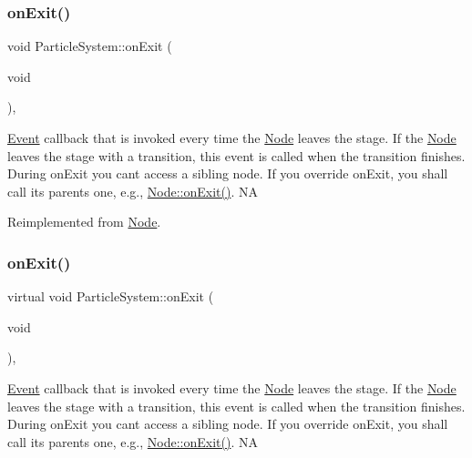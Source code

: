 \subsubsection{\texorpdfstring{on\+Exit()}{onExit()}\hspace{0.1cm}{\footnotesize\ttfamily [1/2]}}
{\footnotesize\ttfamily void Particle\+System\+::on\+Exit (\begin{DoxyParamCaption}\item[{void}]{ }\end{DoxyParamCaption})\hspace{0.3cm}{\ttfamily [override]}, {\ttfamily [virtual]}}

\hyperlink{classEvent}{Event} callback that is invoked every time the \hyperlink{classNode}{Node} leaves the \textquotesingle{}stage\textquotesingle{}. If the \hyperlink{classNode}{Node} leaves the \textquotesingle{}stage\textquotesingle{} with a transition, this event is called when the transition finishes. During on\+Exit you can\textquotesingle{}t access a sibling node. If you override on\+Exit, you shall call its parent\textquotesingle{}s one, e.\+g., \hyperlink{classNode_ac83de835ea315e3179d4293acd8903ac}{Node\+::on\+Exit()}.  NA 

Reimplemented from \hyperlink{classNode_ac83de835ea315e3179d4293acd8903ac}{Node}.

\mbox{\label{classParticleSystem_a98582a329312cfc77d39cc872d5c344c}} 
\subsubsection{\texorpdfstring{on\+Exit()}{onExit()}\hspace{0.1cm}{\footnotesize\ttfamily [2/2]}}
{\footnotesize\ttfamily virtual void Particle\+System\+::on\+Exit (\begin{DoxyParamCaption}\item[{void}]{ }\end{DoxyParamCaption})\hspace{0.3cm}{\ttfamily [override]}, {\ttfamily [virtual]}}

\hyperlink{classEvent}{Event} callback that is invoked every time the \hyperlink{classNode}{Node} leaves the \textquotesingle{}stage\textquotesingle{}. If the \hyperlink{classNode}{Node} leaves the \textquotesingle{}stage\textquotesingle{} with a transition, this event is called when the transition finishes. During on\+Exit you can\textquotesingle{}t access a sibling node. If you override on\+Exit, you shall call its parent\textquotesingle{}s one, e.\+g., \hyperlink{classNode_ac83de835ea315e3179d4293acd8903ac}{Node\+::on\+Exit()}.  NA 


